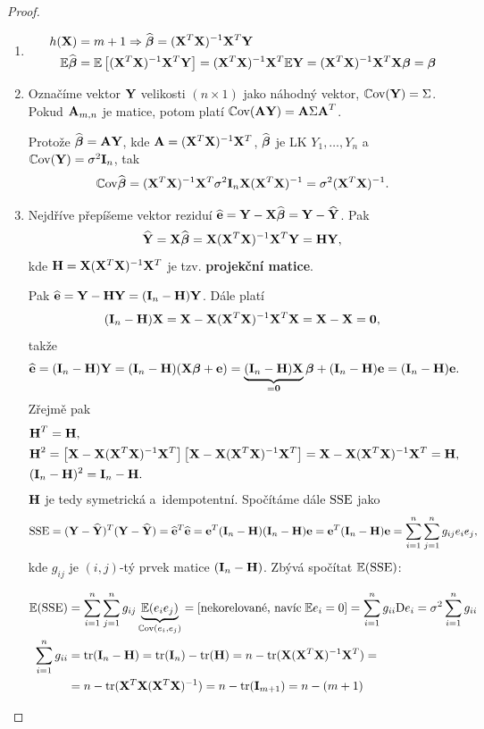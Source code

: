 \begin{proof}
\begin{enumerate}
\item
\begin{align*}
	h(\X) & = m + 1 \Rightarrow \wbetab = (\X^T \X)^{-1} \X^T \Y \\
	\E \wbetab & = \E \left[(\X^T \X)^{-1} \X^T \Y \right] = (\X^T \X)^{-1} \X^T \E\Y = (\X^T \X)^{-1} \X^T \X \betab = \betab
\end{align*}

\item
Označíme vektor $\Y$ velikosti $(n \times 1)$ jako náhodný vektor, $\Cov(\Y) = \Sigma$. Pokud $\Am_{m, n}$ je matice, potom platí $\Cov(\Am \Y) = \Am \Sigma \Am^T$.

Protože $\wbetab = \Am \Y$, kde $\Am = (\X^T \X)^{-1} \X^T$, $\wbetab$ je LK $Y_1, \dots, Y_n$ a~$\Cov(\Y) = \sigma^2 \In$, tak
 $$
	\Cov \wbetab = (\X^T \X)^{-1} \X^T \sigma^2 \In \X (\X^T \X)^{-1} = \sigma^2 (\X^T \X)^{-1}.
 $$

\item
Nejdříve přepíšeme vektor reziduí $\heb = \Y - \X \wbetab = \Y - \hYb$. Pak
\begin{equation}
	\hYb = \X \wbetab = \X (\X^T \X)^{-1} \X^T \Y = \Hm \Y,
	\label{Eq: HY}
\end{equation}
kde $\Hm = \X (\X^T \X)^{-1} \X^T$ je tzv. \textbf{projekční matice}.
 
Pak $\heb = \Y - \Hm \Y = (\In - \Hm) \Y$. Dále platí
$$(\In - \Hm) \X = \X - \X (\X^T \X)^{-1} \X^T \X = \X - \X = \boldsymbol{0},$$
takže
 $$
	\heb = (\In - \Hm) \Y = (\In - \Hm)(\X \betab + \eb) = \underbrace{(\In - \Hm) \X}_{ = \boldsymbol{0}} \betab + (\In - \Hm) \eb = (\In - \Hm) \eb.
 $$
Zřejmě pak
\begin{align*}
& \Hm^T = \Hm, \\
& \Hm^2 = \left[\X - \X (\X^T \X)^{-1} \X^T \right] \left[\X - \X (\X^T \X)^{-1} \X^T \right] = \X - \X (\X^T \X)^{-1} \X^T = \Hm, \\
& (\In - \Hm)^2 = \In - \Hm.
\end{align*}
$\Hm$ je tedy symetrická a~idempotentní. Spočítáme dále $\SSE$ jako
 $$
	\SSE = (\Y - \hYb)^T(\Y - \hYb) = \heb^T \heb = \eb^T (\In - \Hm)(\In - \Hm) \eb = \eb^T (\In - \Hm) \eb = \sumin \sumjn g_{ij} e_i e_j,
 $$
kde $g_{ij}$ je $(i,j)$-tý prvek matice $(\In - \Hm)$. Zbývá spočítat $\E(\SSE)$:

\begin{align*}
	\E(\SSE) & = \sumin \sumjn g_{ij} \underbrace{\E(e_i e_j)}_{\Cov(e_i, e_j)} = \left[\text{nekorelované, navíc\;} \E e_i = 0 \right] = \sumin g_{ii} \D e_i = \sigma^2 \sumin g_{ii} \\
	\sumin g_{ii} & = \trace(\In - \Hm) = \trace(\In) - \trace(\Hm) = n - \trace(\X (\X^T \X)^{-1} \X^T) = \\
	& = n - \trace(\X^T \X (\X^T \X)^{-1}) = n - \trace(\Identita{m+1}) = n - (m + 1)
\end{align*}


\end{enumerate}
\end{proof}
